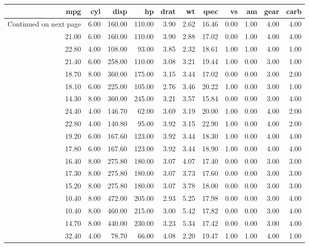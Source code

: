\documentclass[11pt,preprint, authoryear]{elsarticle}
\numberwithin{equation}{section}
\numberwithin{figure}{section}
\numberwithin{table}{section}
\begin{document}
\begingroup\fontsize{12pt}{13pt}\selectfont

\begin{longtable}{rrrrrrrrrrr}
  \toprule
mpg & cyl & disp & hp & drat & wt & qsec & vs & am & gear & carb \\ 
  \hline 
\endhead 
\hline 
{\footnotesize Continued on next page} 
\endfoot 
\endlastfoot 
 \midrule
21.00 & 6.00 & 160.00 & 110.00 & 3.90 & 2.62 & 16.46 & 0.00 & 1.00 & 4.00 & 4.00 \\ 
  21.00 & 6.00 & 160.00 & 110.00 & 3.90 & 2.88 & 17.02 & 0.00 & 1.00 & 4.00 & 4.00 \\ 
  22.80 & 4.00 & 108.00 & 93.00 & 3.85 & 2.32 & 18.61 & 1.00 & 1.00 & 4.00 & 1.00 \\ 
  21.40 & 6.00 & 258.00 & 110.00 & 3.08 & 3.21 & 19.44 & 1.00 & 0.00 & 3.00 & 1.00 \\ 
  18.70 & 8.00 & 360.00 & 175.00 & 3.15 & 3.44 & 17.02 & 0.00 & 0.00 & 3.00 & 2.00 \\ 
  18.10 & 6.00 & 225.00 & 105.00 & 2.76 & 3.46 & 20.22 & 1.00 & 0.00 & 3.00 & 1.00 \\ 
  14.30 & 8.00 & 360.00 & 245.00 & 3.21 & 3.57 & 15.84 & 0.00 & 0.00 & 3.00 & 4.00 \\ 
  24.40 & 4.00 & 146.70 & 62.00 & 3.69 & 3.19 & 20.00 & 1.00 & 0.00 & 4.00 & 2.00 \\ 
  22.80 & 4.00 & 140.80 & 95.00 & 3.92 & 3.15 & 22.90 & 1.00 & 0.00 & 4.00 & 2.00 \\ 
  19.20 & 6.00 & 167.60 & 123.00 & 3.92 & 3.44 & 18.30 & 1.00 & 0.00 & 4.00 & 4.00 \\ 
  17.80 & 6.00 & 167.60 & 123.00 & 3.92 & 3.44 & 18.90 & 1.00 & 0.00 & 4.00 & 4.00 \\ 
  16.40 & 8.00 & 275.80 & 180.00 & 3.07 & 4.07 & 17.40 & 0.00 & 0.00 & 3.00 & 3.00 \\ 
  17.30 & 8.00 & 275.80 & 180.00 & 3.07 & 3.73 & 17.60 & 0.00 & 0.00 & 3.00 & 3.00 \\ 
  15.20 & 8.00 & 275.80 & 180.00 & 3.07 & 3.78 & 18.00 & 0.00 & 0.00 & 3.00 & 3.00 \\ 
  10.40 & 8.00 & 472.00 & 205.00 & 2.93 & 5.25 & 17.98 & 0.00 & 0.00 & 3.00 & 4.00 \\ 
  10.40 & 8.00 & 460.00 & 215.00 & 3.00 & 5.42 & 17.82 & 0.00 & 0.00 & 3.00 & 4.00 \\ 
  14.70 & 8.00 & 440.00 & 230.00 & 3.23 & 5.34 & 17.42 & 0.00 & 0.00 & 3.00 & 4.00 \\ 
  32.40 & 4.00 & 78.70 & 66.00 & 4.08 & 2.20 & 19.47 & 1.00 & 1.00 & 4.00 & 1.00 \\ 

\end{longtable}
\end{document}
